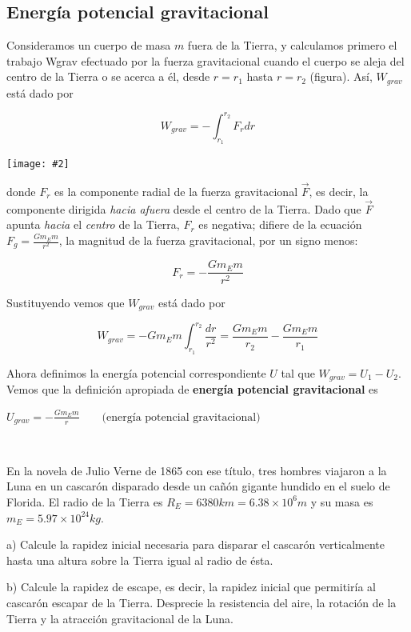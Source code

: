 \documentclass{article}
\newcommand{\newsubsection}[1]{
    \vspace{0.5cm}
    \color{sectionColor}
    \subsection{\bl{#1}}
    \color{black}
    \vspace{0.5cm}
}
\newcommand{\newex}[1]{
    \vspace{0.5cm}
    \noindent{\large \color{exerciceColor} \textbf{#1}}\\[0.2cm]
}
\newcommand{\bl}[1]{\textbf{#1}}
\newcommand{\definicion}[1]{%
    \vspace{0.5cm}
    \begin{definicionbox}
        #1
    \end{definicionbox}
    \vspace{0.5cm}
}
\newcommand{\ladoALado}[4]{
    \begin{minipage}[t]{#3\textwidth}
        \vspace{0pt}
        #1
    \end{minipage}
    \hfill
    \begin{minipage}[t]{#4\textwidth}
        \vspace{0pt}
        \centering
        \texttt{[image: \#2]}
    \end{minipage}
}
\begin{document}
    \newsubsection{Energía potencial gravitacional}

    \ladoALado{
        \par Consideramos un cuerpo de masa $m$ fuera de la Tierra, y calculamos primero el trabajo Wgrav efectuado por la fuerza gravitacional cuando el cuerpo se aleja del centro de la Tierra o se acerca a él, desde $r = r_1$ hasta $r = r_2$ (ﬁgura). Así, $W_{grav}$ está dado por

        \[ W_{grav} = - \int_{r_1}^{r_2} F_r dr \]
    }{img/11.3-1.png}{0.5}{0.5}

    \par donde $F_r$ es la componente radial de la fuerza gravitacional $\vec{F}$, es decir, la componente dirigida \textit{hacia afuera} desde el centro de la Tierra. Dado que $\vec{F}$ apunta \textit{hacia} el \textit{centro} de la Tierra, $F_r$ es negativa; diﬁere de la ecuación $ F_g = \frac{G m_E m}{r^2} $, la magnitud de la fuerza gravitacional, por un signo menos:

    \[ F_r = - \frac{G m_E m}{r^2} \]

    \par Sustituyendo vemos que $W_{grav}$ está dado por

    \[ W_{grav} = - G m_E m \int_{r_1}^{r_2} \frac{dr}{r^2} = \frac{G m_E m}{r_2} - \frac{G m_E m}{r_1} \]

    \par Ahora deﬁnimos la energía potencial correspondiente $U$ tal que $W_{grav} = U_1 - U_2$. Vemos que la deﬁnición apropiada de \bl{energía potencial gravitacional} es

    \definicion{
        \centering
        \( U_{grav} = - \frac{G m_E m}{r} \quad \quad \text{(energía potencial gravitacional)} \)
    }

    \newex{Ejercicio 28. “De la Tierra a la Luna”}

    \par En la novela de Julio Verne de 1865 con ese título, tres hombres viajaron a la Luna en un cascarón disparado desde un cañón gigante hundido en el suelo de Florida. El radio de la Tierra es $R_E = 6380 km = 6.38 \times 10^6 m$ y su masa es $m_E = 5.97 \times 10^{24} kg$.

    \begin{list}{}{}
        \item a) Calcule la rapidez inicial necesaria para disparar el cascarón verticalmente hasta una altura sobre la Tierra igual al radio de ésta.
        \item b) Calcule la rapidez de escape, es decir, la rapidez inicial que permitiría al cascarón escapar de la Tierra. Desprecie la resistencia del aire, la rotación de la Tierra y la atracción gravitacional de la Luna.
    \end{list}
\end{document}
